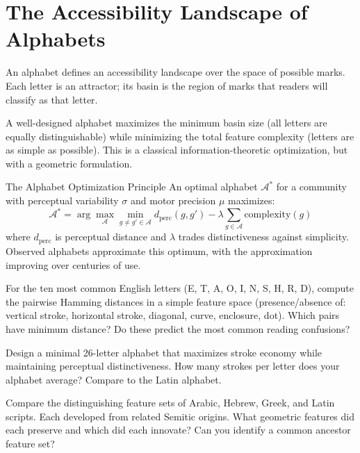 \section{The Accessibility Landscape of Alphabets}

An alphabet defines an accessibility landscape over the space of
possible marks. Each letter is an attractor; its basin is the
region of marks that readers will classify as that letter.

A well-designed alphabet maximizes the minimum basin size (all letters
are equally distinguishable) while minimizing the total feature complexity
(letters are as simple as possible). This is a classical information-theoretic
optimization, but with a geometric formulation.

\begin{namedthm}{The Alphabet Optimization Principle}
  An optimal alphabet $\mathcal{A}^*$ for a community with perceptual
  variability $\sigma$ and motor precision $\mu$ maximizes:
  \[
    \mathcal{A}^* = \arg\max_{\mathcal{A}} \min_{g \neq g' \in \mathcal{A}}
    d_\text{perc}(g, g') - \lambda \sum_{g \in \mathcal{A}} \text{complexity}(g)
  \]
  where $d_\text{perc}$ is perceptual distance and $\lambda$ trades
  distinctiveness against simplicity. Observed alphabets approximate
  this optimum, with the approximation improving over centuries of use.
\end{namedthm}

\begin{exercise}
  For the ten most common English letters (E, T, A, O, I, N, S, H, R, D),
  compute the pairwise Hamming distances in a simple feature space
  (presence/absence of: vertical stroke, horizontal stroke, diagonal,
  curve, enclosure, dot). Which pairs have minimum distance? Do these
  predict the most common reading confusions?
\end{exercise}

\begin{exercise}
  Design a minimal 26-letter alphabet that maximizes stroke economy
  while maintaining perceptual distinctiveness. How many strokes per
  letter does your alphabet average? Compare to the Latin alphabet.
\end{exercise}

\begin{exercise}[title={Cross-linguistic}]
  Compare the distinguishing feature sets of Arabic, Hebrew, Greek,
  and Latin scripts. Each developed from related Semitic origins.
  What geometric features did each preserve and which did each innovate?
  Can you identify a common ancestor feature set?
\end{exercise}
